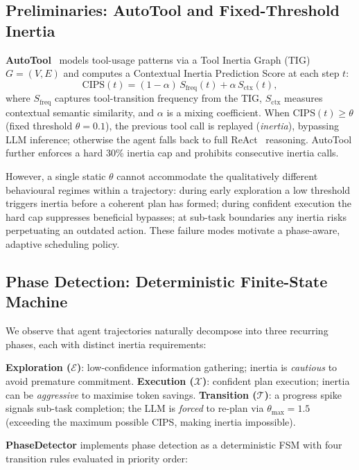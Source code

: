 \documentclass[runningheads]{llncs}
\begin{document}
\subsection{Preliminaries: AutoTool and Fixed-Threshold Inertia}
\label{sec:background}
\textbf{AutoTool}~\cite{autotool} models tool-usage patterns via a Tool Inertia Graph (TIG) $G=(V,E)$ and computes a Contextual Inertia Prediction Score at each step $t$:
\begin{equation}
  \mathrm{CIPS}(t) = (1-\alpha)\,S_{\mathrm{freq}}(t) + \alpha\,S_{\mathrm{ctx}}(t),
  \label{eq:cips}
\end{equation}
where $S_{\mathrm{freq}}$ captures tool-transition frequency from the TIG, $S_{\mathrm{ctx}}$ measures contextual semantic similarity, and $\alpha$ is a mixing coefficient.
When $\mathrm{CIPS}(t)\ge\theta$ (fixed threshold $\theta=0.1$), the previous tool call is replayed (\emph{inertia}), bypassing LLM inference; otherwise the agent falls back to full ReAct~\cite{react} reasoning.
AutoTool further enforces a hard 30\% inertia cap and prohibits consecutive inertia calls.

However, a single static $\theta$ cannot accommodate the qualitatively different behavioural regimes within a trajectory: during early exploration a low threshold triggers inertia before a coherent plan has formed; during confident execution the hard cap suppresses beneficial bypasses; at sub-task boundaries any inertia risks perpetuating an outdated action.
These failure modes motivate a phase-aware, adaptive scheduling policy.


\subsection{Phase Detection: Deterministic Finite-State Machine}
\label{sec:phase_detector}
We observe that agent trajectories naturally decompose into three recurring phases, each with distinct inertia requirements:

  \textbf{Exploration ($\mathcal{E}$)}: low-confidence information gathering; inertia is \emph{cautious} to avoid premature commitment.
  \textbf{Execution ($\mathcal{X}$)}: confident plan execution; inertia can be \emph{aggressive} to maximise token savings.
  \textbf{Transition ($\mathcal{T}$)}: a progress spike signals sub-task completion; the LLM is \emph{forced} to re-plan via $\theta_{\max}=1.5$ (exceeding the maximum possible CIPS, making inertia impossible).


\textbf{PhaseDetector} implements phase detection as a deterministic FSM with four transition rules evaluated in priority order:
\end{document}
